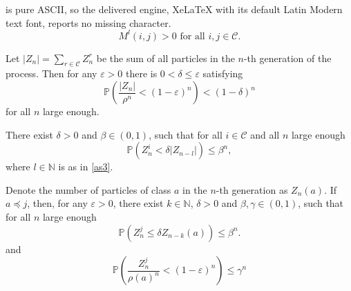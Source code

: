 \documentclass[10pt,a4paper]{amsart}
\begin{document}
is pure ASCII, so the delivered engine, XeLaTeX with its default Latin Modern text font, reports no missing character.
\begin{equation}\label{as3}
    M^l(i,j) > 0 \text{ for all } i,j \in \mathcal{C}.
\end{equation} 

         \begin{lemma}\label{lemma}
         Let $|Z_n| = \sum_{r \in \mathcal{C}} Z^r_n$ be the sum of all particles in the $n$-th generation of the process. Then for any $\varepsilon > 0$ there is $ 0< \delta \leq \varepsilon$ satisfying
         \[
         \mathbb{P} \left(\frac{|Z_n|} {\rho^n}  <  {(1-\varepsilon)^n} \right) < (1-\delta)^{ n}
         \]
         for all $n$ large enough. 
     \end{lemma}

     \begin{lemma}\label{lemma2}
     There exist $\delta >0$ and $\beta \in (0,1)$, such that for all $i \in \mathcal{C}$ and all $n$ large enough 
     \[
     \mathbb{P}(Z_n^i < \delta |Z_{n-l}|) \leq \beta^n,
     \]where $l \in \mathbb{N}$ is as in \eqref{as3}.
     \end{lemma}

\begin{lemma}\label{lemma3}
Denote the number of particles of class $a$ in the $n$-th generation as $Z_n(a)$. If $a \preceq j$, then, for any $\varepsilon > 0$, there exist $k \in \mathbb{N}$, $\delta >0$ and $\beta,\gamma \in (0,1)$, such that for all $n$ large enough 
     \begin{equation}\label{l3:1}
         \mathbb{P}\left(Z^j_n \leq \delta  Z_{n-k}(a)\right) \leq \beta^n.
     \end{equation}
       and
    \begin{equation}\label{l3:2}
        \mathbb{P}\left(\frac{Z_{n}^j} {\rho(a)^n}< (1-\varepsilon)^n\right) \leq \gamma^n
    \end{equation}
    
    
\end{lemma}
\end{document}
